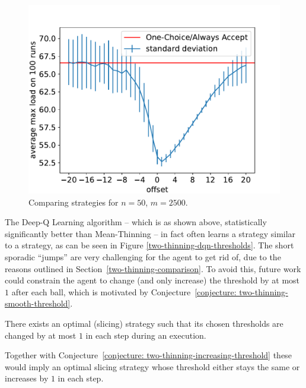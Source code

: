 \begin{figure}[h]
    \centering
    \includegraphics[scale=0.6]{Chapter4/Figs/offset_analysis_50_2500.pdf}
    \caption{Comparing \ConstantOffset strategies for $n=50$, $m=2500$.}
    \label{two-thinning-constant-offset}
\end{figure}





The Deep-Q Learning algorithm -- which is as shown above, statistically significantly better than Mean-Thinning -- in fact often learns a strategy similar to a \ConstantOffset strategy, as can be seen in Figure \ref{two-thinning-dqn-thresholds}. The short sporadic ``jumps'' are very challenging for the agent to get rid of, due to the reasons outlined in Section~\ref{two-thinning-comparison}. To avoid this, future work could constrain the agent to change (and only increase) the threshold by at most $1$ after each ball, which is motivated by Conjecture~\ref{conjecture: two-thinning-smooth-threshold}.


\begin{conjecture}\label{conjecture: two-thinning-smooth-threshold}
There exists an optimal (slicing) strategy such that its chosen thresholds are changed by at most $1$ in each step during an execution.
\end{conjecture}


\begin{remark}
Together with Conjecture~\ref{conjecture: two-thinning-increasing-threshold} these would imply an optimal slicing strategy whose threshold either stays the same or increases by $1$ in each step.
\end{remark}


